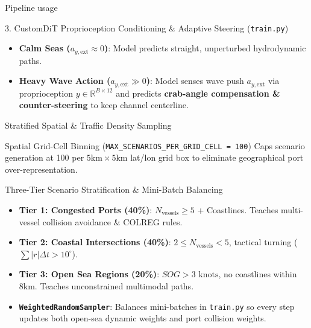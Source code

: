 \documentclass[t]{beamer}
\begin{document}
\begin{frame}{  Pipeline usage}
     \begin{block}{3. CustomDiT Proprioception Conditioning \& Adaptive Steering (\texttt{train.py})}
        \begin{itemize}
            \item \textbf{Calm Seas ($a_{y,\mathrm{ext}} \approx 0$)}: Model predicts straight, unperturbed hydrodynamic paths.
            \item \textbf{Heavy Wave Action ($a_{y,\mathrm{ext}} \gg 0$)}: Model senses wave push $a_{y,\mathrm{ext}}$ via proprioception $y \in \mathbb{R}^{B \times 12}$ and predicts \textbf{crab-angle compensation \& counter-steering} to keep channel centerline.
        \end{itemize}
    \end{block}
\end{frame}
\begin{frame}{Stratified Spatial \& Traffic Density Sampling}
    \begin{block}{Spatial Grid-Cell Binning (\texttt{MAX\_SCENARIOS\_PER\_GRID\_CELL = 100})}
        Caps scenario generation at 100 per $5\text{km} \times 5\text{km}$ lat/lon grid box to eliminate geographical port over-representation.
    \end{block}

    \begin{block}{Three-Tier Scenario Stratification \& Mini-Batch Balancing}
        \begin{itemize}
            \item \textbf{Tier 1: Congested Ports (40\%)}: $N_{\text{vessels}} \ge 5$ + Coastlines. Teaches multi-vessel collision avoidance \& COLREG rules.
            \item \textbf{Tier 2: Coastal Intersections (40\%)}: $2 \le N_{\text{vessels}} < 5$, tactical turning ($\sum |r|\Delta t > 10^\circ$).
            \item \textbf{Tier 3: Open Sea Regions (20\%)}: $SOG > 3\text{ knots}$, no coastlines within 8km. Teaches unconstrained multimodal paths.
        \end{itemize}
    \end{block}

    \begin{itemize}
        \item \textbf{\texttt{WeightedRandomSampler}}: Balances mini-batches in \texttt{train.py} so every step updates both open-sea dynamic weights and port collision weights.
    \end{itemize}
\end{frame}
\end{document}
